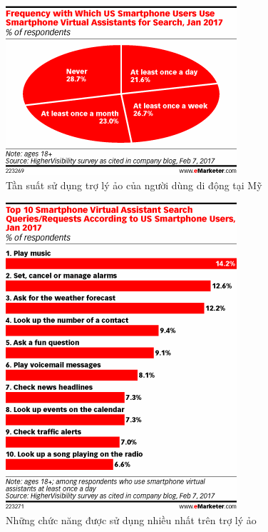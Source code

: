 \documentclass{beamer}
\begin{document}
\begin{frame}
\begin{figure}
\centering
\includegraphics[scale=0.5]{emarketer_1}
\caption{Tần suất sử dụng trợ lý ảo của người dùng di động tại Mỹ\footnotemark}
\end{figure}

\end{frame}

\begin{frame}
\begin{figure}
\centering
\includegraphics[scale=0.45]{emarketer_2}
\caption{Những chức năng được sử dụng nhiều nhất trên trợ lý ảo\footnotemark}
\end{figure}

\end{frame}
\end{document}
